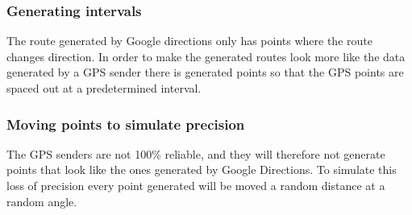 \subsubsection{Generating intervals}
The route generated by Google directions only has points where the route changes direction.
In order to make the generated routes look more like the data generated by a GPS sender there is generated points so that the GPS points are spaced out at a predetermined interval.

\subsubsection{Moving points to simulate precision}
The GPS senders are not 100\% reliable, and they will therefore not generate points that look like the ones generated by Google Directions.
To simulate this loss of precision every point generated will be moved a random distance at a random angle.
